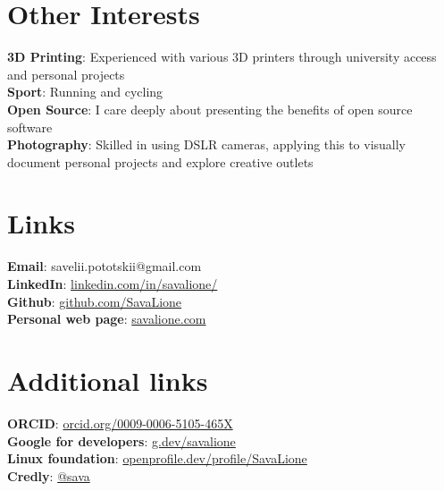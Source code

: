 \documentclass[a4paper,11pt]{article}
\begin{document}
\section{Other Interests}
\begin{itemize}[leftmargin=0.15in, label={}]
    \normalsize{\item{
        \textbf{3D Printing}{: Experienced with various 3D printers through university access and personal projects } \\
        \textbf{Sport}{: Running and cycling} \\
        \textbf{Open Source}{: I care deeply about presenting the benefits of open source software} \\
        \textbf{Photography}{: Skilled in using DSLR cameras, applying this to visually document personal projects and explore creative outlets} \\
    }}    
\end{itemize}

\section{Links}
\begin{itemize}[leftmargin=0.15in, label={}]
    \normalsize{\item{
                    \textbf{Email}{:  savelii.pototskii@gmail.com} \\
                    \textbf{LinkedIn}{:  \href{https://linkedin.com/in/savalione/}{linkedin.com/in/savalione/}} \\
                    \textbf{Github}{:  \href{https://github.com/SavaLione}{github.com/SavaLione}} \\
                    \textbf{Personal web page}{: \href{https://savalione.com}{savalione.com} } \\
              }}
\end{itemize}

\section{Additional links}
\begin{itemize}[leftmargin=0.15in, label={}]
    \normalsize{\item{
                    \textbf{ORCID}{: \href{https://orcid.org/0009-0006-5105-465X}{orcid.org/0009-0006-5105-465X} } \\
                    \textbf{Google for developers}{: \href{https://g.dev/savalione}{g.dev/savalione} } \\
                    \textbf{Linux foundation}{: \href{https://openprofile.dev/profile/SavaLione}{openprofile.dev/profile/SavaLione} } \\
                    \textbf{Credly}{: \href{https://www.credly.com/users/sava}{@sava} } \\
              }}
\end{itemize}
\end{document}
